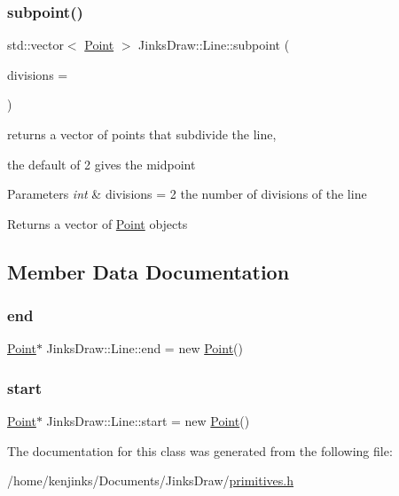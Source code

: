 \subsubsection{\texorpdfstring{subpoint()}{subpoint()}}
{\footnotesize\ttfamily std\+::vector$<$ \mbox{\hyperlink{class_jinks_draw_1_1_point}{Point}} $>$ Jinks\+Draw\+::\+Line\+::subpoint (\begin{DoxyParamCaption}\item[{int}]{divisions = {} }\end{DoxyParamCaption})}



returns a vector of points that subdivide the line, 

the default of 2 gives the midpoint 
\begin{DoxyParams}{Parameters}
{\em int} & divisions = 2 the number of divisions of the line \\
\hline
\end{DoxyParams}
\begin{DoxyReturn}{Returns}
a vector of \mbox{\hyperlink{class_jinks_draw_1_1_point}{Point}} objects 
\end{DoxyReturn}


\subsection{Member Data Documentation}
\mbox{\label{class_jinks_draw_1_1_line_a6c04e4d06b7c8bafff608b1ffae6169b}} 
\subsubsection{\texorpdfstring{end}{end}}
{\footnotesize\ttfamily \mbox{\hyperlink{class_jinks_draw_1_1_point}{Point}}$\ast$ Jinks\+Draw\+::\+Line\+::end = new \mbox{\hyperlink{class_jinks_draw_1_1_point}{Point}}()\hspace{0.3cm}{\ttfamily [private]}}

\mbox{\label{class_jinks_draw_1_1_line_a697fccb64f32b900f86dbc89ac69fec3}} 
\subsubsection{\texorpdfstring{start}{start}}
{\footnotesize\ttfamily \mbox{\hyperlink{class_jinks_draw_1_1_point}{Point}}$\ast$ Jinks\+Draw\+::\+Line\+::start = new \mbox{\hyperlink{class_jinks_draw_1_1_point}{Point}}()\hspace{0.3cm}{\ttfamily [private]}}



The documentation for this class was generated from the following file\+:\begin{DoxyCompactItemize}
\item 
/home/kenjinks/\+Documents/\+Jinks\+Draw/\mbox{\hyperlink{primitives_8h}{primitives.\+h}}\end{DoxyCompactItemize}
